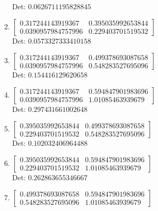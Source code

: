 \documentclass[12pt]{article}
\begin{document}
\begin{enumerate}
Det: $0.0626711195828845$\\

\item $\displaystyle \left[\begin{matrix}0.317244143919367 & 0.395035992653844\\0.0390957984757996 & 0.229403701519532\end{matrix}\right]$\\

Det: $0.0573327333410158$\\

\item $\displaystyle \left[\begin{matrix}0.317244143919367 & 0.499378693087658\\0.0390957984757996 & 0.548283527695096\end{matrix}\right]$\\

Det: $0.154416129620658$\\

\item $\displaystyle \left[\begin{matrix}0.317244143919367 & 0.594847901983696\\0.0390957984757996 & 1.01085463939679\end{matrix}\right]$\\

Det: $0.297431661002648$\\

\item $\displaystyle \left[\begin{matrix}0.395035992653844 & 0.499378693087658\\0.229403701519532 & 0.548283527695096\end{matrix}\right]$\\

Det: $0.102032406964488$\\

\item $\displaystyle \left[\begin{matrix}0.395035992653844 & 0.594847901983696\\0.229403701519532 & 1.01085463939679\end{matrix}\right]$\\

Det: $0.262863655346667$\\

\item $\displaystyle \left[\begin{matrix}0.499378693087658 & 0.594847901983696\\0.548283527695096 & 1.01085463939679\end{matrix}\right]$\\


\end{enumerate}
\end{document}

